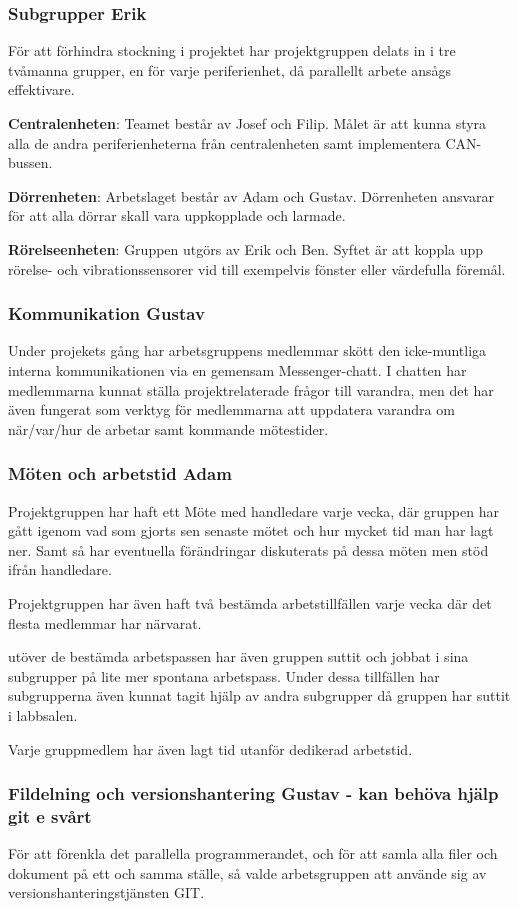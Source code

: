 \documentclass{article}
\begin{document}
\subsubsection{Subgrupper Erik}
För att förhindra stockning i projektet har projektgruppen delats in i tre tvåmanna grupper, en för varje periferienhet, då parallellt arbete ansågs effektivare.

\textbf{Centralenheten}: Teamet består av Josef och Filip. Målet är att kunna styra alla de andra periferienheterna från centralenheten samt implementera CAN-bussen.

\textbf{Dörrenheten}: Arbetslaget består av Adam och Gustav. Dörrenheten ansvarar för att alla dörrar skall vara uppkopplade och larmade.

\textbf{Rörelseenheten}: Gruppen utgörs av Erik och Ben. Syftet är att koppla upp rörelse- och vibrationssensorer vid till exempelvis fönster eller värdefulla föremål.

\subsubsection{Kommunikation Gustav}
Under projekets gång har arbetsgruppens medlemmar skött den icke-muntliga 
interna kommunikationen via en gemensam Messenger-chatt. 
I chatten har medlemmarna kunnat ställa projektrelaterade 
frågor till varandra, men det har även fungerat som verktyg
 för medlemmarna att uppdatera varandra om när/var/hur de 
 arbetar samt kommande mötestider.
\subsubsection{Möten och arbetstid Adam}
Projektgruppen har haft ett Möte med handledare varje vecka, där
gruppen har gått igenom vad som gjorts sen senaste mötet och hur
mycket tid man har lagt ner. Samt så har eventuella förändringar
diskuterats på dessa möten men stöd ifrån handledare.

Projektgruppen har även haft två bestämda arbetstillfällen varje
vecka där det flesta medlemmar har närvarat. 

utöver de bestämda arbetspassen har även gruppen suttit och 
jobbat i sina subgrupper på lite mer spontana arbetspass. Under
dessa tillfällen har subgrupperna även kunnat tagit hjälp av 
andra subgrupper då gruppen har suttit i labbsalen.

Varje gruppmedlem har även lagt tid utanför dedikerad arbetstid.  

\subsubsection{Fildelning och versionshantering Gustav - kan behöva hjälp git e svårt}
För att förenkla det parallella programmerandet, och för att samla alla filer och dokument 
på ett och samma ställe, så valde arbetsgruppen att använde sig av versionshanteringstjänsten GIT.
\end{document}

